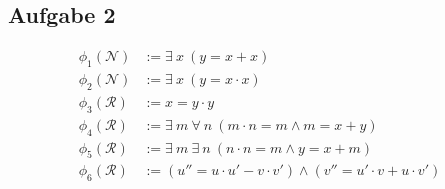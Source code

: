 \documentclass[a4paper,10pt]{article}
\begin{document}
\subsection*{Aufgabe 2}
\begin{align*}
\phi_1(\mathcal{N}) &:= \exists~ x~ (y = x + x) \\
\phi_2(\mathcal{N}) &:= \exists~ x~ (y = x \cdot x) \\
\phi_3(\mathcal{R}) &:= x = y \cdot y \\
\phi_4(\mathcal{R}) &:= \exists~ m~ \forall~ n~ (m \cdot n = m \wedge m = x + y) \\
\phi_5(\mathcal{R}) &:= \exists~ m~ \exists~ n~ (n \cdot n = m \wedge y = x + m) \\
\phi_6(\mathcal{R}) &:= (u'' = u \cdot u' - v \cdot v') \wedge (v'' = u' \cdot v + u \cdot v') \\
\end{align*}
\end{document}
